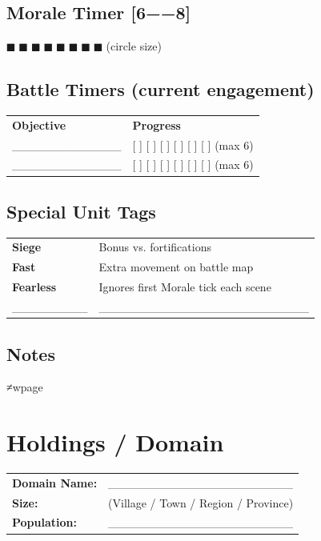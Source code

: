 \documentclass[11pt]{article}
\begin{document}
\subsection*{Morale Timer [6−−8]}
\noindent
$■$ $■$ $■$ $■$ $■$ $■$ $■$ $■$ (circle size)

\subsection*{Battle Timers (current engagement)}
\small
\begin{tabularx}{\textwidth}{p{5cm} X}
\textbf{Objective} & \textbf{Progress} \\
_____________ & [ ] [ ] [ ] [ ] [ ] [ ] (max 6) \\
_____________ & [ ] [ ] [ ] [ ] [ ] [ ] (max 6) \\
\end{tabularx}
\normalsize

\subsection*{Special Unit Tags}
\small
\begin{tabularx}{\textwidth}{p{2.5cm} X}
\textbf{Siege} & Bonus vs. fortifications \\
\textbf{Fast} & Extra movement on battle map \\
\textbf{Fearless} & Ignores first Morale tick each scene \\
_________ & _________________________ \\
\end{tabularx}
\normalsize

\subsection*{Notes}
\vspace{5cm}
≠wpage

\section*{Holdings / Domain}

\noindent
\begin{tabularx}{\textwidth}{X X}
\textbf{Domain Name:} & ______________________ \\
\textbf{Size:} & (Village / Town / Region / Province) \\
\textbf{Population:} & ______________________ \\
\end{tabularx}
\end{document}
